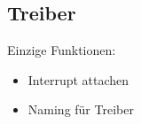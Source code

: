 \subsection{Treiber}



Einzige Funktionen:

\begin{itemize}
	\item Interrupt attachen
	\item Naming für Treiber
\end{itemize}